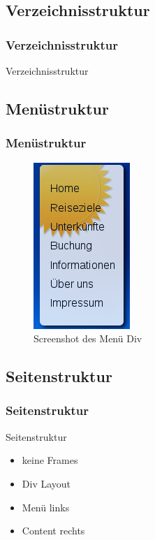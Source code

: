 \documentclass[xcolor=dvipsnames]{beamer}
\begin{document}
\subsection{Verzeichnisstruktur}
\begin{frame} %
  \frametitle{Verzeichnisstruktur} %
  \begin{block}{Verzeichnisstruktur}
  \end{block}
\end{frame}

\subsection{Menüstruktur}
\begin{frame} %
  \frametitle{Menüstruktur} %
	\begin{figure}
	\includegraphics[scale=0.8]{screenshot_menue.png}
	\caption{Screenshot des Menü Div}
	\end{figure}
\end{frame}

\subsection{Seitenstruktur}
\begin{frame} %
  \frametitle{Seitenstruktur} %
  \begin{block}{Seitenstruktur}
	\begin{itemize}
		\item keine Frames
		\item Div Layout
		\item Menü links
		\item Content rechts
	\end{itemize}
  \end{block}
\end{frame}
\end{document}
